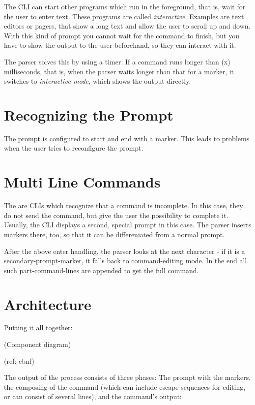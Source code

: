 \documentclass[a4paper,twoside,abstract=on,cleardoublepage=empty,numbers=noenddot,toc=bib]{scrreprt}
\begin{document}
The \textsc{CLI} can start other programs which run in the foreground, that is, wait for the user to enter text. These programs are called \emph{interactive}. Examples are text editors or pagers, that show a long text and allow the user to scroll up and down. With this kind of prompt you cannot wait for the command to finish, but you have to show the output to the user beforehand, so they can interact with it.

The parser solves this by using a timer: If a command runs longer than (x) milliseconds, that is, when the parser waits longer than that for a marker, it switches to \emph{interactive mode}, which shows the output directly.

\section{Recognizing the Prompt}

The prompt is configured to start and end with a marker. This leads to problems when the user tries to reconfigure the prompt.

\section{Multi Line Commands}

The are \textsc{CLI}s which recognize that a command is incomplete. In this case, they do not send the command, but give the user the possibility to complete it. Usually, the CLI displays a second, special prompt in this case. The parser inserts markers there, too, so that it can be differeniated from a normal prompt.

After the above enter handling, the parser looks at the next character - if it is a secondary-prompt-marker, it falls back to command-editing mode. In the end all such part-command-lines are appended to get the full command.

\section{Architecture}

Putting it all together:

(Component diagram)

(ref: ebnf)


The output of the process consists of three phases: The prompt with the markers, the composing of the command (which can include escape sequences for editing, or can consist of several lines), and the command's output:
\end{document}
